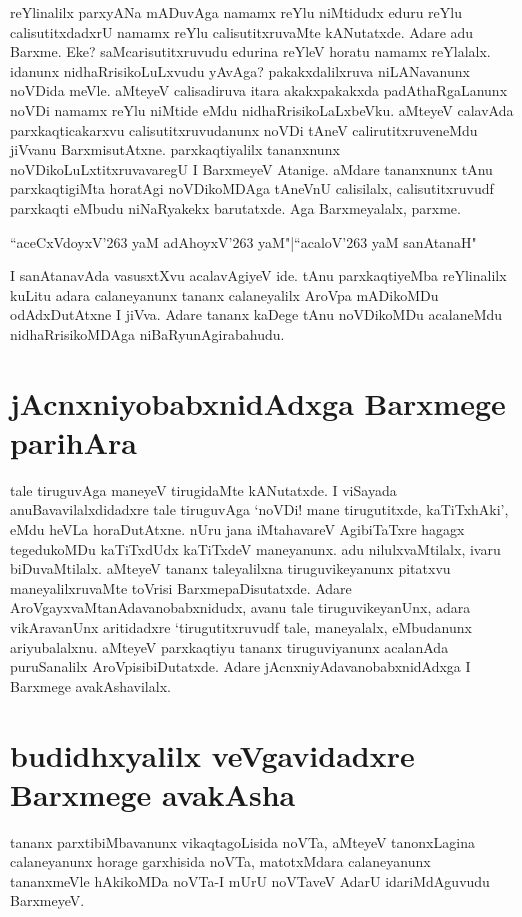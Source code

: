 reYlinalilx parxyANa mADuvAga namamx reYlu niMtidudx eduru reYlu calisutitxdadxrU namamx reYlu calisutitxruvaMte kANutatxde. Adare adu Barxme. Eke? saMcarisutitxruvudu edurina reYleV horatu namamx reYlalalx. idanunx nidhaRrisikoLuLxvudu yAvAga? pakakxdalilxruva niLANavanunx noVDida meVle. aMteyeV calisadiruva itara akakxpakakxda padAthaRgaLanunx noVDi namamx reYlu niMtide eMdu nidhaRrisikoLaLxbeVku. aMteyeV calavAda parxkaqticakarxvu calisutitxruvudanunx noVDi tAneV calirutitxruveneMdu jiVvanu BarxmisutAtxne. parxkaqtiyalilx tananxnunx noVDikoLuLxtitxruvavaregU I BarxmeyeV Atanige. aMdare tananxnunx tAnu parxkaqtigiMta horatAgi noVDikoMDAga tAneVnU calisilalx, calisutitxruvudf parxkaqti eMbudu niNaRyakekx barutatxde. Aga Barxmeyalalx, parxme.

\begin{shloka}
``aceCxVdoyxV\char'263 yaM adAhoyxV\char'263 yaM"|``acaloV\char'263 yaM sanAtanaH"
\end{shloka}

I sanAtanavAda vasusxtXvu acalavAgiyeV ide. tAnu parxkaqtiyeMba reYlinalilx kuLitu adara calaneyanunx tananx calaneyalilx AroVpa mADikoMDu odAdxDutAtxne I jiVva. Adare tananx kaDege tAnu noVDikoMDu acalaneMdu nidhaRrisikoMDAga niBaRyunAgirabahudu.

\section*{jAcnxniyobabxnidAdxga Barxmege parihAra}

tale tiruguvAga maneyeV tirugidaMte kANutatxde. I viSayada anuBavavilalxdidadxre tale tiruguvAga `noVDi! mane tirugutitxde, kaTiTxhAki', eMdu heVLa horaDutAtxne. nUru jana iMtahavareV AgibiTaTxre hagagx tegedukoMDu kaTiTxdUdx kaTiTxdeV maneyanunx. adu nilulxvaMtilalx, ivaru biDuvaMtilalx. aMteyeV tananx taleyalilxna tiruguvikeyanunx pitatxvu maneyalilxruvaMte toVrisi BarxmepaDisutatxde. Adare AroVgayxvaMtanAdavanobabxnidudx, avanu tale tiruguvikeyanUnx, adara vikAravanUnx aritidadxre `tirugutitxruvudf tale, maneyalalx, eMbudanunx ariyubalalxnu. aMteyeV parxkaqtiyu tananx tiruguviyanunx acalanAda puruSanalilx AroVpisibiDutatxde. Adare jAcnxniyAdavanobabxnidAdxga I Barxmege avakAshavilalx.

\section*{budidhxyalilx veVgavidadxre Barxmege avakAsha}
tananx parxtibiMbavanunx vikaqtagoLisida noVTa, aMteyeV tanonxLagina calaneyanunx horage garxhisida noVTa, matotxMdara calaneyanunx  tananxmeVle hAkikoMDa noVTa-I mUrU noVTaveV AdarU idariMdAguvudu BarxmeyeV.

